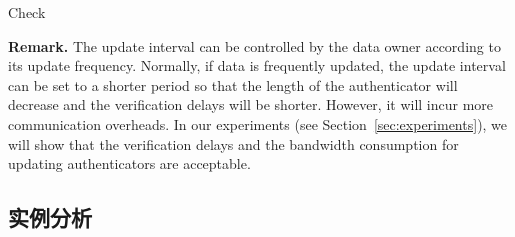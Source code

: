 \begin{algorithm}[t]
  \caption{Check}
  \label{alg:check}
  \begin{algorithmic}[1]
              \ENDIF
                      \BREAK
                    \ENDIF
                \ENDFOR
                \ELSE
                \ENDIF
              \ELSE
              \ENDIF
  \end{algorithmic}
\end{algorithm}

\noindent \textbf{Remark.} The update interval can be controlled by the data owner according to its update frequency. Normally, if data is frequently updated, the update interval can be set to a shorter period so that the length of the authenticator will decrease and the verification delays will be shorter. However, it will incur more communication overheads.
In our experiments (see Section~\ref{sec:experiments}), we will show that the verification delays and the bandwidth consumption for updating authenticators are acceptable.

\subsection{实例分析}

